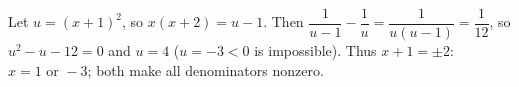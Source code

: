 Let $u=(x+1)^2$, so $x(x+2)=u-1$. Then $\dfrac{1}{u-1}-\dfrac{1}{u}=\dfrac{1}{u(u-1)}=\dfrac{1}{12}$, so $u^2-u-12=0$ and $u=4$ ($u=-3<0$ is impossible). Thus $x+1=\pm2$: $x=\boxed{1\text{ or }-3}$; both make all denominators nonzero.

